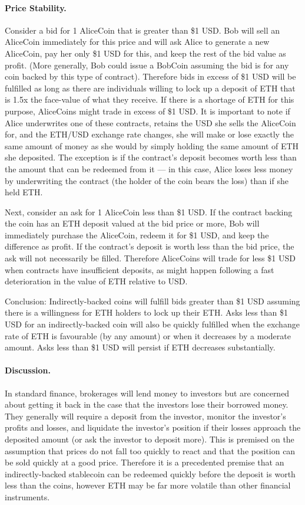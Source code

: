 \paragraph{Price Stability.} Consider a bid for 1 AliceCoin that is greater than \$1 USD. Bob will sell an AliceCoin immediately for this price and will ask Alice to generate a new AliceCoin, pay her only \$1 USD for this, and keep the rest of the bid value as profit. (More generally, Bob could issue a BobCoin assuming the bid is for any coin backed by this type of contract). Therefore bids in excess of \$1 USD will be fulfilled as long as there are individuals willing to lock up a deposit of ETH that is 1.5x the face-value of what they receive. If there is a shortage of ETH for this purpose, AliceCoins might trade in excess of \$1 USD. It is important to note if Alice underwrites one of these contracts, retains the USD she sells the AliceCoin for, and the ETH/USD exchange rate changes, she will make or lose exactly the same amount of money as she would by simply holding the same amount of ETH she deposited. The exception is if the contract's deposit becomes worth less than the amount that can be redeemed from it --- in this case, Alice loses less money by underwriting the contract (the holder of the coin bears the loss) than if she held ETH.


Next, consider an ask for 1 AliceCoin less than \$1 USD. If the contract backing the coin has an ETH deposit valued at the bid price or more, Bob will immediately purchase the AliceCoin, redeem it for \$1 USD, and keep the difference as profit. If the contract's deposit is worth less than the bid price, the ask will not necessarily be filled. Therefore AliceCoins will trade for less \$1 USD when contracts have insufficient deposits, as might happen following a fast deterioration in the value of ETH relative to USD.

Conclusion: Indirectly-backed coins will fulfill bids greater than \$1 USD assuming there is a willingness for ETH holders to lock up their ETH. Asks less than \$1 USD for an indirectly-backed coin will also be quickly fulfilled when the exchange rate of ETH is favourable (by any amount) or when it decreases by a moderate amount. Asks less than \$1 USD will persist if ETH decreases substantially.

\paragraph{Discussion.} In standard finance, brokerages will lend money to investors but are concerned about getting it back in the case that the investors lose their borrowed money. They generally will require a deposit from the investor, monitor the investor's profits and losses, and liquidate the investor's position if their losses approach the deposited amount (or ask the investor to deposit more). This is premised on the assumption that prices do not fall too quickly to react and that the position can be sold quickly at a good price. Therefore it is a precedented premise that an indirectly-backed stablecoin can be redeemed quickly before the deposit is worth less than the coins, however ETH may be far more volatile than other financial instruments.

